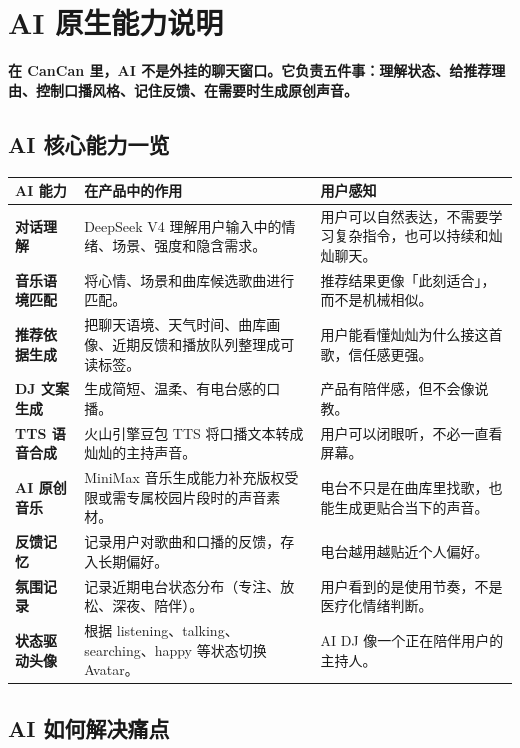 \documentclass[UTF8,a4paper,11pt,fontset=windows]{ctexart}
\begin{document}
\section{AI 原生能力说明}

\textbf{在 CanCan 里，AI 不是外挂的聊天窗口。它负责五件事：理解状态、给推荐理由、控制口播风格、记住反馈、在需要时生成原创声音。}

\subsection{AI 核心能力一览}

\begin{longtable}{>{\bfseries}p{3.1cm}p{5.7cm}p{5.8cm}}
\toprule
AI 能力 & 在产品中的作用 & 用户感知 \\
\midrule
对话理解 & DeepSeek V4 理解用户输入中的情绪、场景、强度和隐含需求。 & 用户可以自然表达，不需要学习复杂指令，也可以持续和灿灿聊天。 \\
音乐语境匹配 & 将心情、场景和曲库候选歌曲进行匹配。 & 推荐结果更像「此刻适合」，而不是机械相似。 \\
推荐依据生成 & 把聊天语境、天气时间、曲库画像、近期反馈和播放队列整理成可读标签。 & 用户能看懂灿灿为什么接这首歌，信任感更强。 \\
DJ 文案生成 & 生成简短、温柔、有电台感的口播。 & 产品有陪伴感，但不会像说教。 \\
TTS 语音合成 & 火山引擎豆包 TTS 将口播文本转成灿灿的主持声音。 & 用户可以闭眼听，不必一直看屏幕。 \\
AI 原创音乐 & MiniMax 音乐生成能力补充版权受限或需专属校园片段时的声音素材。 & 电台不只是在曲库里找歌，也能生成更贴合当下的声音。 \\
反馈记忆 & 记录用户对歌曲和口播的反馈，存入长期偏好。 & 电台越用越贴近个人偏好。 \\
氛围记录 & 记录近期电台状态分布（专注、放松、深夜、陪伴）。 & 用户看到的是使用节奏，不是医疗化情绪判断。 \\
状态驱动头像 & 根据 listening、talking、searching、happy 等状态切换 Avatar。 & AI DJ 像一个正在陪伴用户的主持人。 \\
\bottomrule
\end{longtable}

\subsection{AI 如何解决痛点}
\end{document}
